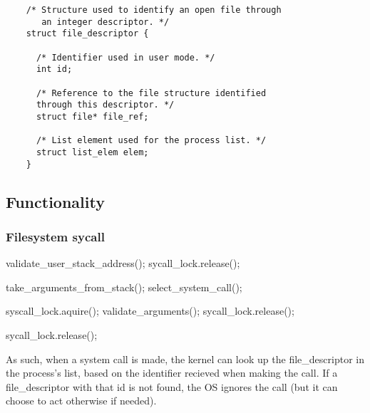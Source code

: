 {\begin{lstlisting}
    /* Structure used to identify an open file through 
       an integer descriptor. */
    struct file_descriptor {

      /* Identifier used in user mode. */
      int id;
      
      /* Reference to the file structure identified 
      through this descriptor. */
      struct file* file_ref;
    
      /* List element used for the process list. */
      struct list_elem elem;
    }
    \end{lstlisting}


    \subsection{Functionality}

    \subsubsection{Filesystem sycall}
    \vspace{-3em} %
      \begin{program}

	validate\_user\_stack\_address();
	\IF {}
	  \THEN sycall\_lock.release();
	\FI

	take\_arguments\_from\_stack();
	select\_system\_call();
	
	syscall\_lock.aquire();
	validate\_arguments();
	\IF {}
	  \THEN sycall\_lock.release();
	\FI
	

	\IF {}
	  \THEN sycall\_lock.release();
	\FI


      \end{program}

    As such, when a system call is made, the kernel can look up the file\_descriptor in the process's list, based on the identifier recieved when making the call. If a file\_descriptor with that id is not found, the OS ignores the call (but it can choose to act otherwise if needed).

}
